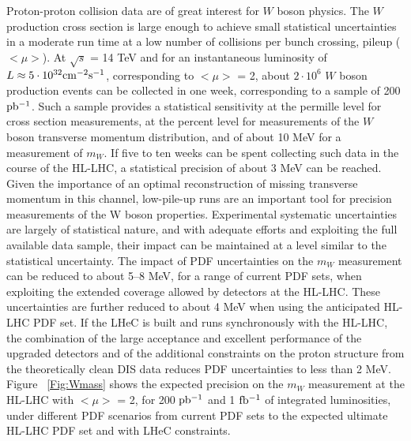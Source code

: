 \documentclass{article}
\begin{document}
\vspace{5mm}
\noindent
Proton-proton collision data are of great interest for $W$ boson physics. The $W$ production cross section is large enough to achieve small statistical uncertainties in a moderate run time at a low number of collisions per bunch crossing, pileup ($<\mu>$). At $\sqrt{s}$ = 14 TeV and for an instantaneous luminosity of $L\approx 5\cdot 10^{32} {\rm cm^{-2}s^{-1}}$, corresponding to $<\mu>$ = 2, about $2\cdot 10^{6}$ $W$ boson production events can be collected in one week, corresponding to a sample of 200 ${\rm pb^{-1}}$. Such a sample provides a statistical sensitivity at the permille level for cross section measurements, at the percent level for measurements of the $W$ boson transverse momentum distribution, and of about 10 MeV for a measurement of $m_W$. If five to ten weeks can be spent collecting such data in the course of the HL-LHC, a statistical precision of about 3 MeV can be reached. Given the importance of an optimal reconstruction of missing transverse momentum in this channel, low-pile-up runs are an important tool for precision measurements of the W boson properties.  Experimental systematic uncertainties are largely of statistical nature, and with adequate efforts and exploiting the full available data sample, their impact can be maintained at a level similar to the statistical uncertainty. The impact of PDF uncertainties on the $m_W$ measurement can be reduced to about 5–8 MeV, for a range of current PDF sets, when exploiting the extended coverage allowed by detectors at the HL-LHC. These uncertainties are further reduced to about 4 MeV when using the anticipated HL-LHC PDF set.
If the LHeC is built and runs synchronously with the HL-LHC, the combination of the large acceptance and excellent performance of the upgraded detectors and of the additional constraints on the proton structure from the theoretically clean DIS data reduces PDF uncertainties to less than 2 MeV. Figure ~\ref{Fig:Wmass} shows the expected precision on the $m_W$ measurement at the HL-LHC with $<\mu>$ = 2, for 200 ${\rm pb^{-1}}$ and 1 ${\rm fb^{-1}}$ of integrated luminosities, under different PDF scenarios from current PDF sets to the expected ultimate HL-LHC PDF set and with LHeC constraints.
\end{document}
